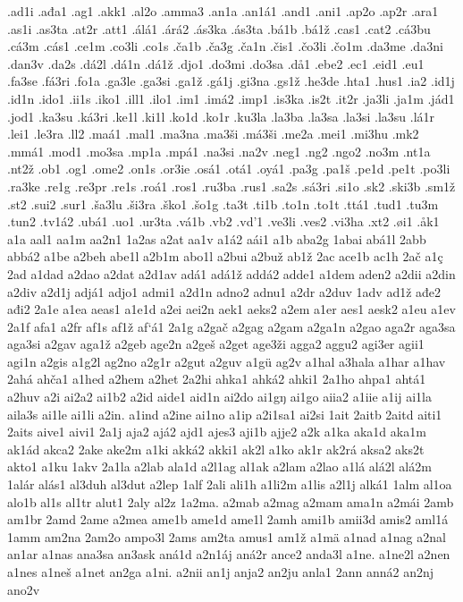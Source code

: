.ad1i
.ađa1
.ag1
.akk1
.al2o
.amma3
.an1a
.an1á1
.and1
.ani1
.ap2o
.ap2r
.ara1
.as1i
.as3ta
.at2r
.att1
.álá1
.árá2
.ás3ka
.ás3ta
.bá1b
.bá1ž
.cas1
.cat2
.cá3bu
.cá3m
.cás1
.ce1m
.co3li
.co1s
.ča1b
.ča3g
.ča1n
.čis1
.čo3li
.čo1m
.da3me
.da3ni
.dan3v
.da2s
.dá2l
.dá1n
.dá1ž
.djo1
.do3mi
.do3sa
.då1
.ebe2
.ec1
.eid1
.eu1
.fa3se
.fá3ri
.fo1a
.ga3le
.ga3si
.ga1ž
.gá1j
.gi3na
.gs1ž
.he3de
.hta1
.hus1
.ia2
.id1j
.id1n
.ido1
.ii1s
.iko1
.ill1
.ilo1
.im1
.imá2
.imp1
.is3ka
.is2t
.it2r
.ja3li
.ja1m
.jád1
.jod1
.ka3su
.ká3ri
.ke1l
.ki1l
.ko1d
.ko1r
.ku3la
.la3ba
.la3sa
.la3si
.la3su
.lá1r
.lei1
.le3ra
.ll2
.maá1
.mal1
.ma3na
.ma3ši
.má3ši
.me2a
.mei1
.mi3hu
.mk2
.mmá1
.mod1
.mo3sa
.mp1a
.mpá1
.na3si
.na2v
.neg1
.ng2
.ngo2
.no3m
.nt1a
.nt2ž
.ob1
.og1
.ome2
.on1s
.or3ie
.osá1
.otá1
.oyá1
.pa3g
.pa1š
.pe1d
.pe1t
.po3li
.ra3ke
.re1g
.re3pr
.re1s
.roá1
.ros1
.ru3ba
.rus1
.sa2s
.sá3ri
.si1o
.sk2
.ski3b
.sm1ž
.st2
.sui2
.sur1
.ša3lu
.ši3ra
.ško1
.šo1g
.ta3t
.ti1b
.to1n
.to1t
.ttá1
.tud1
.tu3m
.tun2
.tv1á2
.ubá1
.uo1
.ur3ta
.vá1b
.vb2
.vd'1
.ve3li
.ves2
.vi3ha
.xt2
.øi1
.åk1
a1a
aal1
aa1m
aa2n1
1a2as
a2at
aa1v
a1á2
aái1
a1b
aba2g
1abai
abá1l
2abb
abbá2
a1be
a2beh
abe1l
a2b1m
abo1l
a2bui
a2buž
ab1ž
2ac
ace1b
ac1h
2ač
a1ç
2ad
a1dad
a2dao
a2dat
a2d1av
adá1
adá1ž
addá2
adde1
a1dem
aden2
a2dii
a2din
a2div
a2d1j
adjá1
adjo1
admi1
a2d1n
adno2
adnu1
a2dr
a2duv
1adv
ad1ž
ađe2
ađi2
2a1e
a1ea
aeas1
a1e1d
a2ei
aei2n
aek1
aeks2
a2em
a1er
aes1
aesk2
a1eu
a1ev
2a1f
afa1
a2fr
af1s
af1ž
af`á1
2a1g
a2gač
a2gag
a2gam
a2ga1n
a2gao
aga2r
aga3sa
aga3si
a2gav
aga1ž
a2geb
age2n
a2geš
a2get
age3ži
agga2
aggu2
agi3er
agii1
agi1n
a2gis
a1g2l
ag2no
a2g1r
a2gut
a2guv
a1gü
ag2v
a1hal
a3hala
a1har
a1hav
2ahá
ahča1
a1hed
a2hem
a2het
2a2hi
ahka1
ahká2
ahki1
2a1ho
ahpa1
ahtá1
a2huv
a2i
ai2a2
ai1b2
a2id
aide1
aid1n
ai2do
ai1gŋ
ai1go
aiia2
a1iie
a1ij
ai1la
aila3s
ai1le
ai1li
a2in.
a1ind
a2ine
ai1no
a1ip
a2i1sa1
ai2si
1ait
2aitb
2aitd
aiti1
2aits
aive1
aivi1
2a1j
aja2
ajá2
ajd1
ajes3
aji1b
ajje2
a2k
a1ka
aka1d
aka1m
ak1ád
akca2
2ake
ake2m
a1ki
akká2
akki1
ak2l
a1ko
ak1r
ak2rá
aksa2
aks2t
akto1
a1ku
1akv
2a1la
a2lab
ala1d
a2l1ag
al1ak
a2lam
a2lao
a1lá
alá2l
alá2m
1alár
alás1
al3duh
al3dut
a2lep
1alf
2ali
ali1h
a1li2m
a1lis
a2l1j
alká1
1alm
al1oa
alo1b
al1s
al1tr
alut1
2aly
al2z
1a2ma.
a2mab
a2mag
a2mam
ama1n
a2mái
2amb
am1br
2amd
2ame
a2mea
ame1b
ame1d
ame1l
2amh
ami1b
amii3d
amis2
aml1á
1amm
am2na
2am2o
ampo3l
2ams
am2ta
amus1
am1ž
a1mä
a1nad
a1nag
a2nal
an1ar
a1nas
ana3sa
an3ask
aná1d
a2n1áj
aná2r
ance2
anda3l
a1ne.
a1ne2l
a2nen
a1nes
a1neš
a1net
an2ga
a1ni.
a2nii
an1j
anja2
an2ju
anla1
2ann
anná2
an2nj
ano2v
